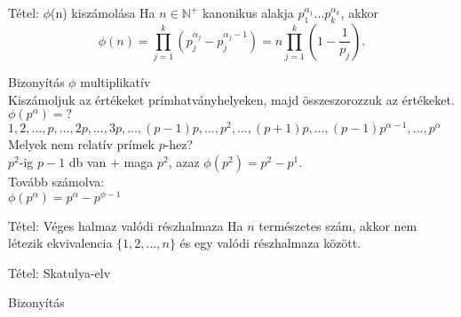 \documentclass{beamer}
\begin{document}
\begin{frame}

\begin{block}{Tétel: ${\phi}$(n) kiszámolása}
Ha $n \in \mathbb{N}^+$ kanonikus alakja $p_1^{{\alpha}_1}...p_k^{{\alpha}_k}$, akkor\\
$${\phi}(n) = \prod^k_{j=1} (p_j^{{\alpha}_j} - p_j^{{\alpha}_j - 1}) = n \prod^k_{j=1} (1 - \frac{1}{p_j}).$$
\end{block}

\begin{block}{Bizonyítás}
$\phi$ multiplikatív\\
Kiszámoljuk az értékeket prímhatványhelyeken, majd összeszorozzuk az értékeket.\\
${\phi}(p^{\alpha}) = ?$\\
$1, 2, ..., p, ..., 2p, ..., 3p, ..., (p-1)p, ..., p^2, ..., (p+1)p, ..., (p-1)p^{{\alpha}-1}, ..., p^{\alpha}$\\
Melyek nem relatív prímek $p$-hez?\\
\smallskip
$p^2$-ig $p - 1$ db van + maga $p^2$, azaz ${\phi}(p^2) = p^2 - p^1$.\\
Tovább számolva:\\
${\phi}(p^{\alpha}) = p^{\alpha} - p^{\phi - 1}$

\end{block}

\end{frame}

\begin{frame}[plain]
\end{frame}

\begin{frame}

\begin{block}{Tétel: Véges halmaz valódi részhalmaza}
Ha $n$ természetes szám, akkor nem létezik ekvivalencia $\{1, 2, ..., n\}$ és egy valódi részhalmaza között.	

\end{block}

\end{frame}

\begin{frame}

\begin{block}{Tétel: Skatulya-elv}
\end{block}

\begin{block}{Bizonyítás}
\end{block}

\end{frame}
\end{document}
